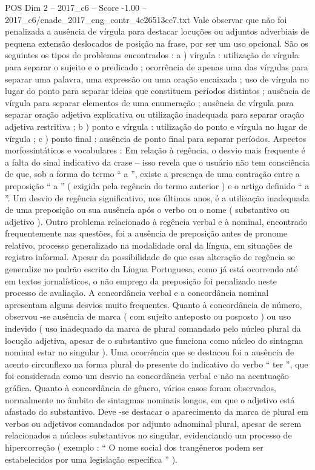 \begin{textsample}{POS Dim 2 – 2017\_c6 – Score -1.00 – 2017\_c6/enade\_2017\_eng\_contr\_4e26513cc7.txt}
Vale observar que não foi penalizada a ausência de vírgula para destacar locuções ou adjuntos adverbiais de pequena extensão deslocados de posição na frase, por ser um uso opcional.
São os seguintes os tipos de problemas encontrados : a ) vírgula : utilização de vírgula para separar o sujeito e o predicado ; ocorrência de apenas uma das vírgulas para separar uma palavra, uma expressão ou uma oração encaixada ; uso de vírgula no lugar do ponto para separar ideias que constituem períodos distintos ; ausência de vírgula para separar elementos de uma enumeração ; ausência de vírgula para separar oração adjetiva explicativa ou utilização inadequada para separar oração adjetiva restritiva ; b ) ponto e vírgula : utilização do ponto e vírgula no lugar de vírgula ; c ) ponto final : ausência de ponto final para separar períodos.
Aspectos morfossintáticos e vocabulares : Em relação à regência, o desvio mais frequente é a falta do sinal indicativo da crase – isso revela que o usuário não tem consciência de que, sob a forma do termo “ a ”, existe a presença de uma contração entre a preposição “ a ” ( exigida pela regência do termo anterior ) e o artigo definido “ a ”.
Um desvio de regência significativo, nos últimos anos, é a utilização inadequada de uma preposição ou sua ausência após o verbo ou o nome ( substantivo ou adjetivo ).
Outro problema relacionado à regência verbal e à nominal, encontrado frequentemente nas questões, foi a ausência de preposição antes de pronome relativo, processo generalizado na modalidade oral da língua, em situações de registro informal.
Apesar da possibilidade de que essa alteração de regência se generalize no padrão escrito da Língua Portuguesa, como já está ocorrendo até em textos jornalísticos, o não emprego da preposição foi penalizado neste processo de avaliação.
A concordância verbal e a concordância nominal apresentam alguns desvios muito frequentes.
Quanto à concordância de número, observou -se ausência de marca ( com sujeito anteposto ou posposto ) ou uso indevido ( uso inadequado da marca de plural comandado pelo núcleo plural da locução adjetiva, apesar de o substantivo que funciona como núcleo do sintagma nominal estar no singular ).
Uma ocorrência que se destacou foi a ausência de acento circunflexo na forma plural do presente do indicativo do verbo “ ter ”, que foi considerada como um desvio na concordância verbal e não na acentuação gráfica.
Quanto à concordância de gênero, vários casos foram observados, normalmente no âmbito de sintagmas nominais longos, em que o adjetivo está afastado do substantivo.
Deve -se destacar o aparecimento da marca de plural em verbos ou adjetivos comandados por adjunto adnominal plural, apesar de serem relacionados a núcleos substantivos no singular, evidenciando um processo de hipercorreção ( exemplo : “ O nome social dos trangêneros podem ser estabelecidos por uma legislação específica ” ).

\end{textsample}
